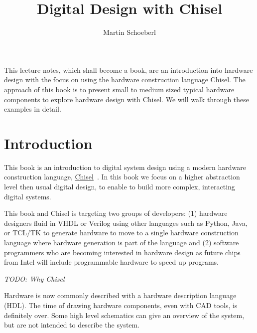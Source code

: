 \documentclass[%
    11pt, %
    headinclude, footexclude,
    openright, %
    notitlepage,
    cleardoubleempty,
    headsepline,
    pointlessnumbers,
    bibtotoc, idxtotoc,
    ]{scrbook}
\newcommand{\todo}[1]{{\emph{TODO: #1}}}
\begin{document}
\title{Digital Design with Chisel}

\author{Martin Schoeberl}




\maketitle \thispagestyle{empty}

This lecture notes, which shall become a book, are an introduction into hardware design with the focus
on using the hardware construction language
\href{https://chisel.eecs.berkeley.edu/}{Chisel}. The approach of this book
is to present small to medium sized typical hardware components to explore
hardware design with Chisel.
We will walk through these examples in detail.


\chapter{Introduction}
\label{sec:intro}

This book is an introduction to digital system design using a modern hardware
construction language, \href{https://chisel.eecs.berkeley.edu/}{Chisel}~\cite{chisel:dac2012}.
In this book we focus on a higher abstraction level then usual digital design,
to enable to build more complex, interacting digital systems.

This book and Chisel is targeting two groups of developers:
(1) hardware designers fluid in VHDL or Verilog using other languages such as Python,
Java, or TCL/TK to generate hardware to move to a single hardware construction language
where hardware generation is part of the language and
(2) software programmers who are becoming interested in hardware design as future chips
from Intel will include programmable hardware to speed up programs.

\todo{Why Chisel}

Hardware is now commonly described with a hardware description language (HDL).
The time of drawing hardware components, even with CAD tools, is definitely
over. Some high level schematics can give an overview of the system, but are
not intended to describe the system.
\end{document}
